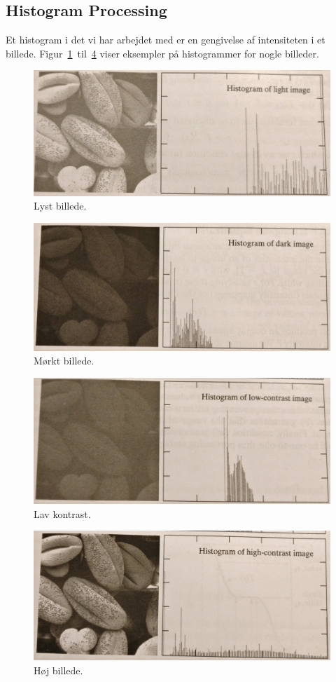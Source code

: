 \subsection{Histogram Processing}\label{sec:histogram-processing}

Et histogram i det vi har arbejdet med er en gengivelse af intensiteten i et billede. Figur~\ref{fig:hist-light}~til~\ref{fig:hist-high} viser eksempler på histogrammer for nogle billeder.

\begin{figure}[H]
	\centering
	\includegraphics[width=0.6\linewidth]{figs/spm01/hist-light.png}
	\caption{Lyst billede.}
	\label{fig:hist-light}
\end{figure}

\begin{figure}[H]
	\centering
	\includegraphics[width=0.6\linewidth]{figs/spm01/hist-dark.png}
	\caption{Mørkt billede.}
	\label{fig:hist-dark}
\end{figure}

\begin{figure}[H]
	\centering
	\includegraphics[width=0.6\linewidth]{figs/spm01/hist-low.png}
	\caption{Lav kontrast.}
	\label{fig:hist-low}
\end{figure}

\begin{figure}[H]
	\centering
	\includegraphics[width=0.6\linewidth]{figs/spm01/hist-high.png}
	\caption{Høj billede.}
	\label{fig:hist-high}
\end{figure}